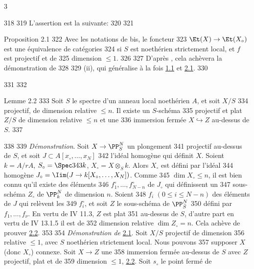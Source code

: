 3	\documentclass[10pt]{../fichiers-configuration-latex/smfart}
\begin{document}
   318	
   319	L'assertion est la suivante:
   320	
   321	\begin{enonce*}{Proposition 2.1}
   322	Avec les notations de \rm{} bis, le foncteur
   323	$\Et(X)\rightarrow \Et(X_{\circ})$ est une équivalence de catégories
   324	si $S$ est noethérien strictement local, et $f$ est projectif et de
   325	dimension $\leq 1$.
   326	
   327	D'après {\rm {}}, cela achèvera la démonstration de {\rm
   328	   
   329	(ii)}, qui généralise à la fois \hyperref[XIII.prop1.1]{1.1} et \hyperref[XIII.prop2.1]{2.1}.
   330	\end{enonce*}
   331	
   332	\begin{enonce*}{Lemme 2.2}
   333	Soit $S$ le spectre d'un anneau local noethérien $A$, et soit $X/S$
   334	projectif, de dimension relative $\leq n$. Il existe un $S$-schéma
   335	projectif et plat $Z/S$ de dimension relative $\leq n$ et une
   336	immersion fermée $X\hookrightarrow Z$ au-dessus de $S$.
   337	\end{enonce*}
   338	
   339		\emph{Démonstration}. Soit $X\rightarrow \PP^N_S$ un plongement
   341	projectif au-dessus de $S$, et soit $J\subset A[x_{\circ},\ldots,x_N]$
   342	l'idéal homogène qui définit $X$. Soient $k=A/rA$, $S_{\circ}=\Spec
   343	k$, $X_{\circ}=X\otimes_S k$. Alors $X_{\circ}$ est défini par l'idéal
   344	homogène $J_{\circ}=\Iim(J\rightarrow k[X_{\circ},\ldots,X_N])$. Comme
   345	$\dim X_{\circ}\leq n$, il est bien connu qu'il existe des éléments
   346	$f^{\circ}_1,\ldots,f^{\circ}_{N-n}$ de $J_{\circ}$ qui définissent un
   347	sous-schéma $Z_{\circ}$ de $\PP^N_k$ de dimension $n$. Soient
   348	$f_i$ $(0 \leq i\leq N-n)$ des éléments de $J$ qui relèvent les
   349	$f^{\circ}_i$, et soit $Z$ le sous-schéma de $\PP^N_{\bar{S}}$
   350	défini par $f_1,\ldots,f_{\nu}$. En vertu de \EGA IV 11.3, $Z$ est plat
   351	au-dessus de $S$, d'autre part en vertu de \EGA IV 13.1.5 il est de
   352	dimension relative $\dim Z_{\circ}=n$. Cela achève de prouver \hyperref[XIII.lem2.2]{2.2}.
   353	
   354		\emph{Démonstration de} \hyperref[XIII.prop2.1]{2.1}. Soit $X/S$ projectif de dimension
   356	relative $\leq 1$, avec $S$ noethérien strictement local. Nous pouvons
   357	supposer $X$ (donc $X_{\circ}$) connexe. Soit $X\rightarrow Z$ une
   358	immersion fermée au-dessus de $S$ avec $Z$ projectif, plat et de
   359	dimension $\leq 1$, \cf \hyperref[XIII.lem2.2]{2.2}. Soit $s_{\circ}$ le point fermé de
\end{document}
